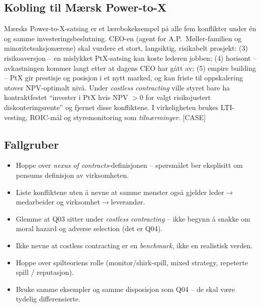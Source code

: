\subsection*{Kobling til Mærsk Power-to-X}
Mærsks Power-to-X-satsing er et lærebok\-eksempel på alle fem konflikter under én og samme investeringsbeslutning. CEO-en (agent for A.P.\ Møller-familien og minoritets\-aksjonærene) skal vurdere et stort, langsiktig, risikabelt prosjekt: (3) risikoaversjon -- en mislykket PtX-satsing kan koste lederen jobben; (4) horisont -- avkastningen kommer langt etter at dagens CEO har gått av; (5) empire building -- PtX gir prestisje og posisjon i et nytt marked, og kan friste til oppskalering utover NPV-optimalt nivå. Under \emph{costless contracting} ville styret bare ha kontraktfestet ``invester i PtX hvis NPV $> 0$ for valgt risikojustert diskonteringsrente'' og fjernet disse konfliktene. I virkeligheten brukes LTI-vesting, ROIC-mål og styre\-monitoring som \emph{tilnærminger}. [CASE]

\subsection*{Fallgruber}
\begin{itemize}\setlength{\itemsep}{2pt}
\item Hoppe over \emph{nexus of contracts}-definisjonen -- spørsmålet ber eksplisitt om pensums definisjon av virksomheten.
\item Liste konfliktene uten å nevne at samme mønster også gjelder leder$\to$medarbeider og virksomhet$\to$leverandør.
\item Glemme at Q03 sitter under \emph{costless contracting} -- ikke begynn å snakke om moral hazard og adverse selection (det er Q04).
\item Ikke nevne at costless contracting er en \emph{benchmark}, ikke en realistisk verden.
\item Hoppe over spilteoriens rolle (monitor/shirk-spill, mixed strategy, repeterte spill / reputasjon).
\item Bruke samme eksempler og samme disposisjon som Q04 -- de skal være tydelig differensierte.
\end{itemize}

\FloatBarrier
